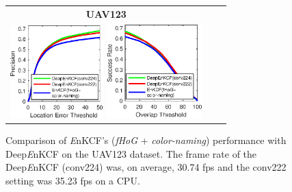 \documentclass[10pt,twocolumn,letterpaper]{article}
\begin{document}
\begin{figure}[!h]
\centering
\begin{tabular}{ccc}
\tiny\quad\quad\textbf{UAV123}\\
\includegraphics[width=3.60cm]{./figures/pr_deep.eps}
\includegraphics[width=3.70cm]{./figures/sr_deep.eps}\\
\end{tabular}
\caption{Comparison of {\it E}nKCF's ({\it fHoG} + {\it color-naming})
  performance with Deep{\it E}nKCF on the UAV123 dataset. The frame
  rate of the Deep{\it E}nKCF (conv224) was, on average, 30.74 fps and
  the conv222 setting was 35.23 fps on a CPU.}
\label{fig:UAV123_DATASET_DeepFeatures}
\end{figure}

\end{document}
